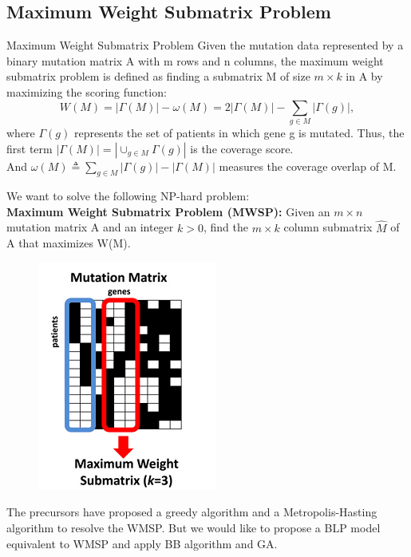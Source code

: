 \documentclass[xcolor=dvipsnames]{beamer}
\begin{document}
\subsection{Maximum Weight Submatrix Problem}
\begin{frame}{Maximum Weight Submatrix Problem}
Given the mutation data represented by a binary mutation matrix A with m rows and n columns, the maximum weight submatrix problem is defined as finding a submatrix M of size $m\times k$ in A by maximizing the scoring function:
\[
W(M)=|\Gamma(M)|-\omega(M)=2|\Gamma(M)|-\sum_{g\in M}|\Gamma(g)|,
\]
where $\Gamma(g)$ represents the set of patients in which gene g is mutated. Thus, the first term $|\Gamma(M)|=|\cup_{g\in M}\Gamma(g)|$ is the coverage score.\\
And $\omega(M)\triangleq \sum_{g\in M}|\Gamma(g)|-|\Gamma(M)|$ measures the coverage overlap of M.\\
\end{frame}
\begin{frame}
We want to solve the following NP-hard problem:\\
\textbf{Maximum Weight Submatrix Problem (MWSP):} Given an $m \times n$ mutation matrix A and an integer $k > 0$, find the $m \times k$ column submatrix $\hat{M}$ of A that maximizes W(M).\\
\begin{figure}
\centering
\includegraphics[width=0.4\linewidth]{mat.png}
\end{figure}
\end{frame}
\begin{frame}
The precursors have proposed a greedy algorithm and a Metropolis-Hasting algorithm to resolve the WMSP. But we would like to propose a BLP model equivalent to WMSP and apply BB algorithm and GA.
\end{frame}
\end{document}
